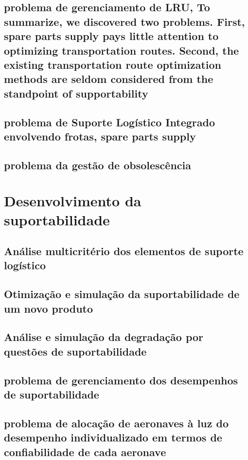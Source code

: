 \documentclass{article}
\begin{document}
\subsection{problema de gerenciamento de LRU, To summarize, we discovered two problems. First, spare parts supply pays little attention to optimizing transportation routes. Second, the existing transportation route optimization methods are seldom considered from the standpoint of supportability}

\subsection{problema de Suporte Logístico Integrado envolvendo frotas, spare parts supply}

\subsection{problema da gestão de obsolescência}

\section{Desenvolvimento da suportabilidade}

\subsection{Análise multicritério dos elementos de suporte logístico}

\subsection{Otimização e simulação da suportabilidade de um novo produto}

\subsection{Análise e simulação da degradação por questões de suportabilidade}

\subsection{problema de gerenciamento dos desempenhos de suportabilidade}

\subsection{problema de alocação de aeronaves à luz do desempenho individualizado em termos de confiabilidade de cada aeronave}
\end{document}
